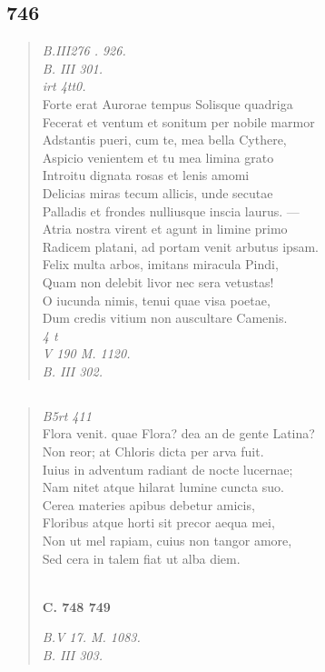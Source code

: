 \documentclass[11pt, a4paper]{report}
\begin{document}
            \subsection*{746}
      \begin{verse}
      \textit{B.III276 . 926.} \\ \textit{B. III 301.} \\ \textit{irt 4tt0.} \\ Forte erat Aurorae tempus Solisque quadriga \\ Fecerat et ventum et sonitum per nobile marmor \\ Adstantis pueri, cum te, mea bella Cythere, \\ Aspicio venientem et tu mea limina grato \\ Introitu dignata rosas et lenis amomi \\ Delicias miras tecum allicis, unde secutae \\ Palladis et frondes nulliusque inscia laurus. — \\ Atria nostra virent et agunt in limine primo \\ Radicem platani, ad portam venit arbutus ipsam. \\ Felix multa arbos, imitans miracula Pindi, \\ Quam non delebit livor nec sera vetustas! \\ O iucunda nimis, tenui quae visa poetae, \\ Dum credis vitium non auscultare Camenis. \\ \textit{4 t} \\ \textit{V 190 M. 1120.} \\ \textit{B. III 302.} \\ 
      \end{verse}
  
            \subsection*{}
      \begin{verse}
      \textit{B5rt 411} \\ Flora venit. quae Flora? dea an de gente Latina? \\ Non reor; at Chloris dicta per arva fuit. \\ Iuius in adventum radiant de nocte lucernae; \\ Nam nitet atque hilarat lumine cuncta suo. \\ Cerea materies apibus debetur amicis, \\ Floribus atque horti sit precor aequa mei, \\ Non ut mel rapiam, cuius non tangor amore, \\ Sed cera in talem fiat ut alba diem. \\ 
        ﻿\pagebreak 
     \marginpar{[232]} \begin{center} \textbf{C. 748 749} \end{center}\textit{B.V 17. M. 1083.} \\ \textit{B. III 303.} \\ 
      \end{verse}
  
\end{document}
